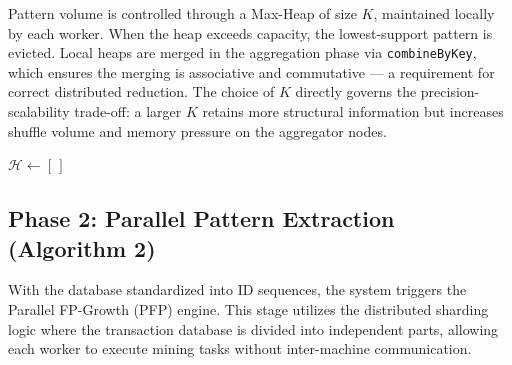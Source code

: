 \documentclass[10pt, twocolumn]{article}
\begin{document}
Pattern volume is controlled through a Max-Heap of size $K$, maintained
locally by each worker. When the heap exceeds capacity, the lowest-support
pattern is evicted. Local heaps are merged in the aggregation phase via
\texttt{combineByKey}, which ensures the merging is associative and
commutative — a requirement for correct distributed reduction. The choice
of $K$ directly governs the precision-scalability trade-off: a larger $K$
retains more structural information but increases shuffle volume and
memory pressure on the aggregator nodes.

\begin{algorithm}[H]
    \caption{Local Top-$K$ FP-Growth}


    $\mathcal{H} \leftarrow [\,]$\;
    \;
\end{algorithm}

\subsection{Phase 2: Parallel Pattern Extraction (Algorithm 2)}

With the database standardized into ID sequences, the system triggers the
Parallel FP-Growth (PFP) engine. This stage utilizes the distributed sharding
logic where the transaction database is divided into independent parts,
allowing each worker to execute mining tasks without inter-machine
communication.
\end{document}
